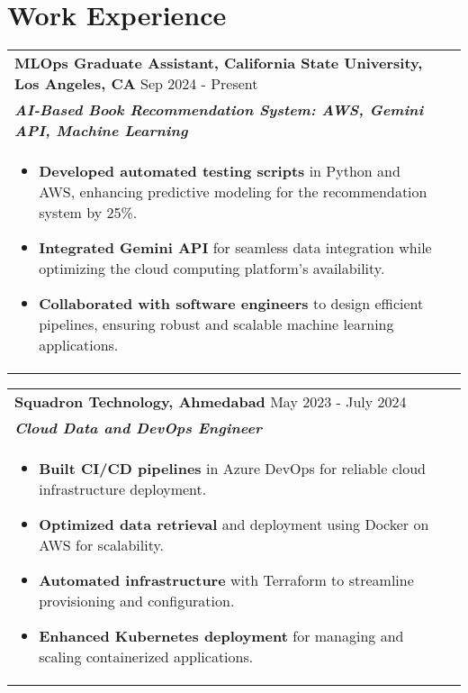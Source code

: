 \documentclass[a4paper,10pt]{article}
\begin{document}
\section{Work Experience}
\begin{tabularx}{\linewidth}{@{}l r@{}}
\textbf{MLOps Graduate Assistant, California State University, Los Angeles, CA} \hfill \color[HTML]{371e77} Sep 2024 - Present \\[1pt]
\color[HTML]{371e77}\textbf{\textit{AI-Based Book Recommendation System: AWS, Gemini API, Machine Learning}} \\[1pt]
\begin{minipage}[t]{\linewidth}
\begin{itemize}[nosep, after=\strut, leftmargin=2em]
\item \textbf{Developed automated testing scripts} in Python and AWS, enhancing predictive modeling for the recommendation system by 25\%.
\item \textbf{Integrated Gemini API} for seamless data integration while optimizing the cloud computing platform's availability.
\item \textbf{Collaborated with software engineers} to design efficient pipelines, ensuring robust and scalable machine learning applications.
\end{itemize}
\end{minipage}
\end{tabularx}

\begin{tabularx}{\linewidth}{@{}l r@{}}
\textbf{Squadron Technology, Ahmedabad} \hfill \color[HTML]{371e77} May 2023 - July 2024 \\[1pt]
\color[HTML]{371e77}\textbf{\textit{Cloud Data and DevOps Engineer}} \\[1pt]
\begin{minipage}[t]{\linewidth}
\begin{itemize}[nosep, after=\strut, leftmargin=2em]
\item \textbf{Built CI/CD pipelines} in Azure DevOps for reliable cloud infrastructure deployment.
\item \textbf{Optimized data retrieval} and deployment using Docker on AWS for scalability.
\item \textbf{Automated infrastructure} with Terraform to streamline provisioning and configuration.
\item \textbf{Enhanced Kubernetes deployment} for managing and scaling containerized applications.
\end{itemize}
\end{minipage}
\end{tabularx}
\end{document}
